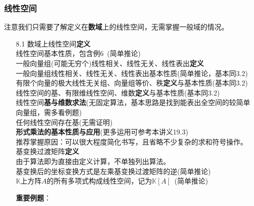 \documentclass[a4paper,UTF8,fontset=windows,AutoFakeBold]{ctexart}
\newcommand*{\note}{\noindent *}
\begin{document}
\subsubsection{线性空间}
注意我们只需要了解定义在\textbf{数域}上的线性空间，无需掌握一般域的情况。
\begin{enumerate}
    \item[8.1] 数域上线性空间\textbf{定义}
    \\线性空间基本性质，包含例6\ (简单推论)
    \\一般向量组(可能无穷个)线性相关、线性无关、线性表出\textbf{定义}
    \\一般向量组线性相关、线性无关、线性表出基本性质(简单推论，基本同3.2)
    \\有限个向量的极大线性无关组、向量组等价、秩\textbf{定义}与基本性质(基本同3.2)
    \\线性空间的基、有限维线性空间、维数\textbf{定义}与基本性质(基本同3.2)
    \\线性空间\textbf{基与维数求法}(无固定算法，基本思路是找到能表出全空间的较简单向量组，需多看例题)
    \\任何线性空间存在基(无需证明)
    \\\textbf{形式乘法的基本性质与应用}(更多运用可参考本讲义19.3)
    \\\note 推荐掌握原因：可以很大程度简化书写，且省略不少复杂的求和符号操作。
    \\基变换过渡矩阵\textbf{定义}
    \\\note 由于算法即为直接由定义计算，不单独列出算法。
    \\基变换后的坐标变换方式是左乘基变换过渡矩阵的逆(简单推论)
    \\$\mathbb{K}$上方阵$A$的所有多项式构成线性空间，记为$\mathbb{K}[A]$\ (简单推论)
    
    \textbf{重要例题}：
    

\end{enumerate}
\end{document}
